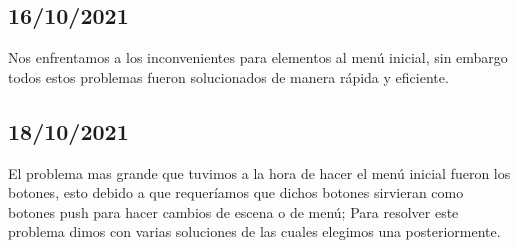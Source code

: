 \documentclass{article}
\begin{document}
    \subsection{16/10/2021}
     Nos enfrentamos a los inconvenientes para elementos al menú inicial, sin embargo todos estos problemas fueron solucionados de manera rápida y eficiente.   
     
    \subsection{18/10/2021}
    El problema mas grande que tuvimos a la hora de hacer el menú inicial fueron los botones, esto debido a que requeríamos que dichos botones sirvieran como botones push para hacer cambios de escena o de menú; Para resolver este problema dimos con varias soluciones de las cuales elegimos una posteriormente.
    
\end{document}
